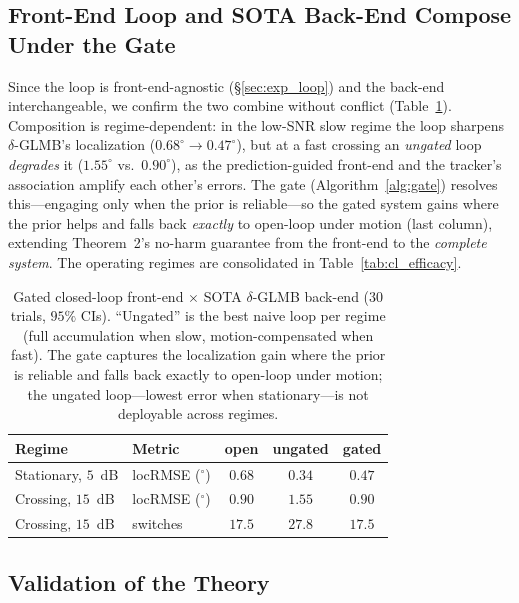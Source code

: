 \documentclass[journal]{IEEEtran}
\begin{document}
\subsection{Front-End Loop and SOTA Back-End Compose Under the Gate}
\label{sec:exp_compose}
Since the loop is front-end-agnostic (\S\ref{sec:exp_loop}) and the back-end
interchangeable, we confirm the two combine without conflict
(Table~\ref{tab:compose}). Composition is regime-dependent: in the low-SNR slow
regime the loop sharpens $\delta$-GLMB's localization
($0.68^\circ\!\to\!0.47^\circ$), but at a fast crossing an \emph{ungated} loop
\emph{degrades} it ($1.55^\circ$ vs.\ $0.90^\circ$), as the prediction-guided
front-end and the tracker's association amplify each other's errors. The gate
(Algorithm~\ref{alg:gate}) resolves this---engaging only when the prior is
reliable---so the gated system gains where the prior helps and falls back
\emph{exactly} to open-loop under motion (last column), extending Theorem~2's
no-harm guarantee from the front-end to the \emph{complete system}. The operating
regimes are consolidated in Table~\ref{tab:cl_efficacy}.

\begin{table}[t]
\centering
\caption{Gated closed-loop front-end $\times$ SOTA $\delta$-GLMB back-end ($30$ trials, $95\%$ CIs). ``Ungated'' is the best naive loop per regime (full accumulation when slow, motion-compensated when fast). The gate captures the localization gain where the prior is reliable and falls back exactly to open-loop under motion; the ungated loop---lowest error when stationary---is not deployable across regimes.}
\label{tab:compose}
\small
\begin{tabular}{@{}llccc@{}}
\toprule
Regime & Metric & open & ungated & gated \\
\midrule
Stationary, $5$~dB & locRMSE ($^\circ$) & $0.68$ & $0.34$ & $\mathbf{0.47}$ \\
Crossing, $15$~dB & locRMSE ($^\circ$) & $0.90$ & $1.55$ & $\mathbf{0.90}$ \\
Crossing, $15$~dB & switches & $17.5$ & $27.8$ & $\mathbf{17.5}$ \\
\bottomrule
\end{tabular}
\end{table}

\subsection{Validation of the Theory}
\label{sec:exp_theory}
\end{document}
